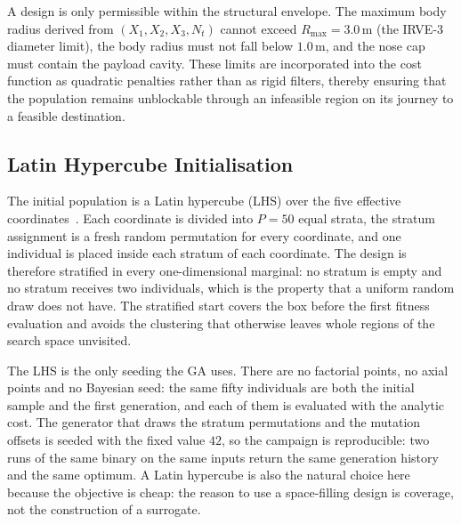 A design is only permissible within the structural envelope. The maximum body radius derived from $(X_1,X_2,X_3,N_t)$ cannot exceed $R_{\max} = 3.0$\,m (the IRVE-3 diameter limit), the body radius must not fall below $1.0$\,m, and the nose cap must contain the payload cavity. These limits are incorporated into the cost function as quadratic penalties rather than as rigid filters, thereby ensuring that the population remains unblockable through an infeasible region on its journey to a feasible destination.

\subsection{Latin Hypercube Initialisation}
The initial population is a Latin hypercube (LHS) over the five effective coordinates~\cite{mckay1979lhs}. Each coordinate is divided into $P=50$ equal strata, the stratum assignment is a fresh random permutation for every coordinate, and one individual is placed inside each stratum of each coordinate. The design is therefore stratified in every one-dimensional marginal: no stratum is empty and no stratum receives two individuals, which is the property that a uniform random draw does not have. The stratified start covers the box before the first fitness evaluation and avoids the clustering that otherwise leaves whole regions of the search space unvisited.

The LHS is the only seeding the GA uses. There are no factorial points, no axial points and no Bayesian seed: the same fifty individuals are both the initial sample and the first generation, and each of them is evaluated with the analytic cost. The generator that draws the stratum permutations and the mutation offsets is seeded with the fixed value $42$, so the campaign is reproducible: two runs of the same binary on the same inputs return the same generation history and the same optimum. A Latin hypercube is also the natural choice here because the objective is cheap: the reason to use a space-filling design is coverage, not the construction of a surrogate.

